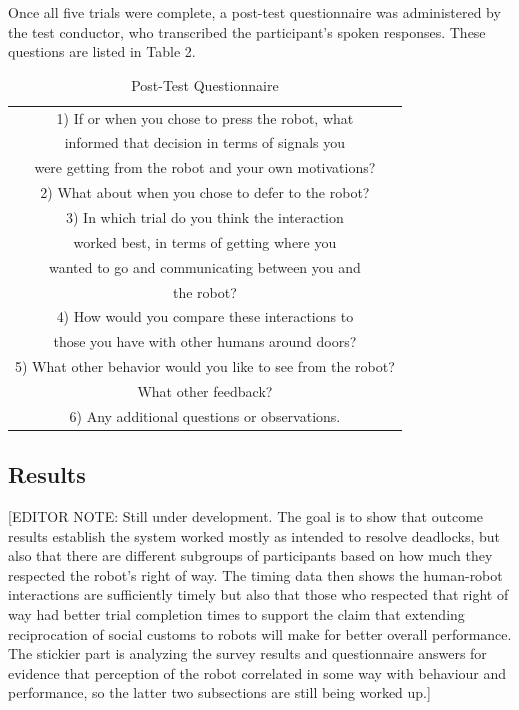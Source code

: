 \documentclass[letterpaper, 10 pt, conference]{ieeeconf}  %
\begin{document}
Once all five trials were complete, a post-test questionnaire was administered by the test conductor, who transcribed the participant’s spoken responses. These questions are listed in Table 2.

\begin{table}[h]
\caption{Post-Test Questionnaire}
\label{questionnaire_questions}
\begin{center}
\begin{tabular}{|c|}
\hline
1) If or when you chose to press the robot, what \\
informed that decision in terms of signals you \\
were getting from the robot and your own motivations?\\
\hline
2) What about when you chose to defer to the robot?\\
\hline
3) In which trial do you think the interaction \\
worked best, in terms of getting where you \\
wanted to go and communicating between you and \\
the robot?\\
\hline
4) How would you compare these interactions to \\
those you have with other humans around doors?\\
\hline
5) What other behavior would you like to see from the robot? \\
What other feedback?\\
\hline
6) Any additional questions or observations.\\
\hline
\end{tabular}
\end{center}
\end{table}

\subsection{Results}

[EDITOR NOTE: Still under development. The goal is to show that outcome results establish the system worked mostly as intended to resolve deadlocks, but also that there are different subgroups of participants based on how much they respected the robot's right of way. The timing data then shows the human-robot interactions are sufficiently timely but also that those who respected that right of way had better trial completion times to support the claim that extending reciprocation of social customs to robots will make for better overall performance. The stickier part is analyzing the survey results and questionnaire answers for evidence that perception of the robot correlated in some way with behaviour and performance, so the latter two subsections are still being worked up.]
\end{document}
